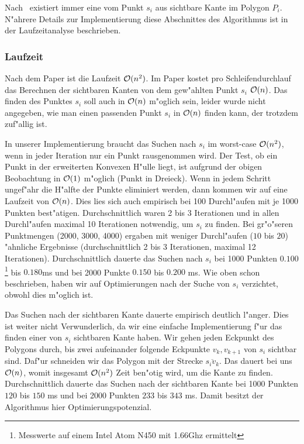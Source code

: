     Nach~\cite{held98polygons} existiert immer eine vom Punkt $s_i$ aus
    sichtbare Kante im Polygon $P_i$. N"ahrere Details zur Implementierung diese
    Abschnittes des Algorithmus ist in der Laufzeitanalyse beschrieben.

  \subsubsection{Laufzeit}

    Nach dem Paper ist die Laufzeit $\mathcal{O}(n^2)$. Im Paper kostet pro
    Schleifendurchlauf das Berechnen der sichtbaren Kanten von dem gew"ahlten
    Punkt $s_i$ $\mathcal{O}(n)$. Das finden des Punktes $s_i$ soll auch in $\mathcal{O}(n)$
    m"oglich sein, leider wurde nicht angegeben, wie man einen passenden Punkt
    $s_i$ in $\mathcal{O}(n)$ finden kann, der trotzdem zuf"allig ist.

    In unserer Implementierung braucht das Suchen nach $s_i$ im worst-case
    $\mathcal{O}(n^2)$, wenn in jeder Iteration nur ein Punkt rausgenommen wird. Der
    Test, ob ein Punkt in der erweiterten Konvexen H"ulle liegt, ist aufgrund
    der obigen Beobachtung in $\mathcal{O}(1)$ m"oglich (Punkt in Dreieck). Wenn in
    jedem Schritt ungef"ahr die H"alfte der Punkte eliminiert werden, dann
    kommen wir auf eine Laufzeit von $\mathcal{O}(n)$. Dies lies sich auch empirisch
    bei 100 Durchl"aufen mit je 1000 Punkten best"atigen. Durchschnittlich waren
    2 bis 3 Iterationen und in allen Durchl"aufen maximal 10 Iterationen
    notwendig, um $s_i$ zu finden. Bei gr"o"seren Punktmengen (2000, 3000, 4000)
    ergaben mit weniger Durchl"aufen ($10$ bis $20$) "ahnliche Ergebnisse
    (durchschnittlich 2 bis 3 Iterationen, maximal 12 Iterationen).
    Durchschnittlich dauerte das Suchen nach $s_i$ bei 1000 Punkten
    $0.100$\footnote{Messwerte auf einem Intel Atom N450 mit 1.66Ghz ermittelt}
    bis $0.180$ms und bei 2000 Punkte $0.150$ bis $0.200$ ms. Wie oben schon
    beschrieben, haben wir auf Optimierungen nach der Suche von $s_i$
    verzichtet, obwohl dies m"oglich ist.

    Das Suchen nach der sichtbaren Kante dauerte empirisch deutlich l"anger.
    Dies ist weiter nicht Verwunderlich, da wir eine einfache Implementierung
    f"ur das finden einer von $s_i$ sichtbaren Kante haben. Wir gehen jeden
    Eckpunkt des Polygons durch, bis zwei aufeinander folgende Eckpunkte $v_k,
    v_{k+1}$ von $s_i$ sichtbar sind. Daf"ur schneiden wir das Polygon mit der
    Strecke $\overline{s_i v_k}$. Das dauert bei uns $\mathcal{O}(n)$, womit insgesamt
    $\mathcal{O}(n^2)$ Zeit ben"otig wird, um die Kante zu finden. Durchschnittlich
    dauerte das Suchen nach der sichtbaren Kante bei 1000 Punkten $120$ bis
    $150$ ms und bei 2000 Punkten $233$ bis $343$ ms. Damit besitzt der
    Algorithmus hier Optimierungspotenzial.

